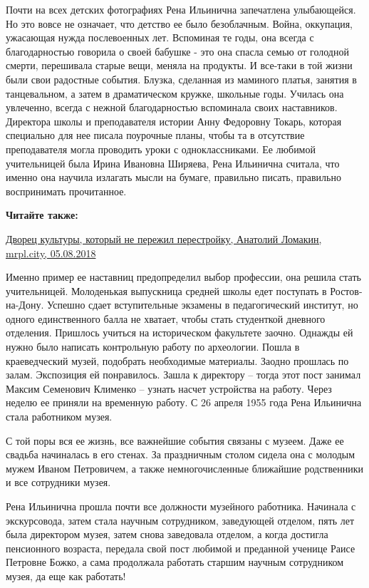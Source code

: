Почти на всех детских фотографиях Рена Ильинична запечатлена улыбающейся. Но
это вовсе не означает, что детство ее было безоблачным. Война, оккупация,
ужасающая нужда послевоенных лет. Вспоминая те годы, она всегда с
благодарностью говорила о своей бабушке - это она спасла семью от голодной
смерти, перешивала старые вещи, меняла на продукты. И все-таки в той жизни были
свои радостные события. Блузка, сделанная из маминого платья, занятия в
танцевальном, а затем в драматическом кружке, школьные годы. Училась она
увлеченно, всегда с нежной благодарностью вспоминала своих наставников.
Директора школы и преподавателя истории Анну Федоровну Токарь, которая
специально для нее писала поурочные планы, чтобы та в отсутствие преподавателя
могла проводить уроки с одноклассниками. Ее любимой учительницей была Ирина
Ивановна Ширяева, Рена Ильинична считала, что именно она научила излагать мысли
на бумаге, правильно писать, правильно воспринимать прочитанное.

\textbf{Читайте также:} 

\href{https://mrpl.city/blogs/view/dvorets-kultury-kotoryj-ne-perezhil-perestrojku}{%
Дворец культуры, который не пережил перестройку, Анатолий Ломакин, mrpl.city, 05.08.2018}

Именно пример ее наставниц предопределил выбор профессии, она решила стать
учительницей. Молоденькая выпускница средней школы едет поступать в
Ростов-на-Дону. Успешно сдает вступительные экзамены в педагогический
институт, но одного единственного балла не хватает, чтобы стать студенткой
дневного отделения. Пришлось учиться на историческом факультете заочно.
Однажды ей нужно было написать контрольную работу по археологии. Пошла в
краеведческий музей, подобрать необходимые материалы. Заодно прошлась по
залам. Экспозиция ей понравилось. Зашла к директору – тогда этот пост занимал
Максим Семенович Клименко – узнать насчет устройства на работу. Через неделю
ее приняли на временную работу. С 26 апреля 1955 года Рена Ильинична стала
работником музея.

С той поры вся ее жизнь, все важнейшие события связаны с музеем. Даже ее
свадьба начиналась в его стенах. За праздничным столом сидела она с молодым
мужем Иваном Петровичем, а также немногочисленные ближайшие родственники и все
сотрудники музея.

Рена Ильинична прошла почти все должности музейного работника. Начинала с
экскурсовода, затем стала научным сотрудником, заведующей отделом, пять лет
была директором музея, затем снова заведовала отделом, а когда достигла
пенсионного возраста, передала свой пост любимой и преданной ученице Раисе
Петровне Божко, а сама продолжала работать старшим научным сотрудником музея,
да еще как работать!

